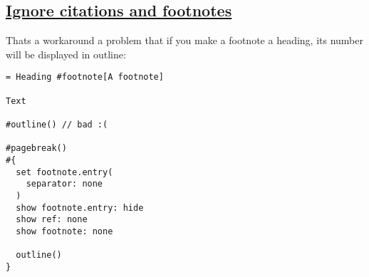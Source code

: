 \subsection{\texorpdfstring{\hyperref[ignore-citations-and-footnotes]{Ignore
citations and
footnotes}}{Ignore citations and footnotes}}\label{ignore-citations-and-footnotes}

That\textquotesingle s a workaround a problem that if you make a
footnote a heading, its number will be displayed in outline:

\begin{verbatim}
= Heading #footnote[A footnote]

Text

#outline() // bad :(

#pagebreak()
#{
  set footnote.entry(
    separator: none
  )
  show footnote.entry: hide
  show ref: none
  show footnote: none

  outline()
}
\end{verbatim}

\pandocbounded{}

\pandocbounded{}
